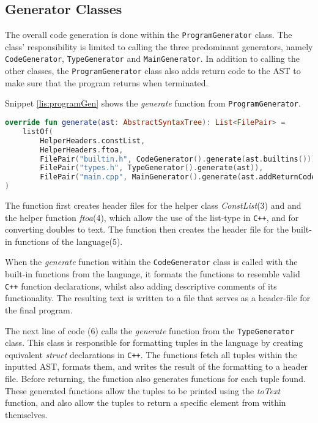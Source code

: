 \subsection{Generator Classes}
The overall code generation is done within the \texttt{ProgramGenerator} class.
The class' responsibility is limited to calling the three predominant generators, namely \texttt{CodeGenerator}, \texttt{TypeGenerator} and \texttt{MainGenerator}.
In addition to calling the other classes, the \texttt{ProgramGenerator} class also adds return code to the AST to make sure that the program returns when terminated.

Snippet \ref{lis:programGen} shows the \textit{generate} function from \texttt{ProgramGenerator}.

\begin{lstlisting}[language=Kotlin,label=lis:programGen,caption=The implementation of \textit{generate} in \texttt{ProgramGenerator}.]
override fun generate(ast: AbstractSyntaxTree): List<FilePair> = 
	listOf(
		HelperHeaders.constList,
		HelperHeaders.ftoa,
		FilePair("builtin.h", CodeGenerator().generate(ast.builtins())),
		FilePair("types.h", TypeGenerator().generate(ast)),
		FilePair("main.cpp", MainGenerator().generate(ast.addReturnCode().notBuiltins()))
)
\end{lstlisting}

The function first creates header files for the helper class \textit{ConstList}(3) and and the helper function \textit{ftoa}(4), which allow the use of the list-type in \texttt{C++}, and for converting doubles to text. 
The function then creates the header file for the built-in functions of the language(5).

When the \textit{generate} function within the \texttt{CodeGenerator} class is called with the built-in functions from the language, it formats the functions to resemble valid \texttt{C++} function declarations, whilst also adding descriptive comments of its functionality.
The resulting text is written to a file that serves as a header-file for the final program.

The next line of code (6) calls the \textit{generate} function from the \texttt{TypeGenerator} class.
This class is responsible for formatting tuples in the language by creating equivalent \textit{struct} declarations in \texttt{C++}.
The functions fetch all tuples within the inputted AST, formats them, and writes the result of the formatting to a header file.
Before returning, the function also generates functions for each tuple found.
These generated functions allow the tuples to be printed using the \textit{toText} function, and also allow the tuples to return a specific element from within themselves.

